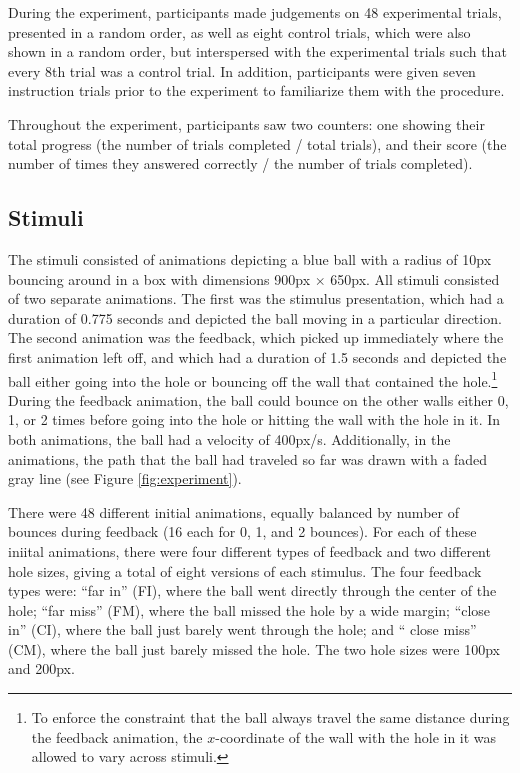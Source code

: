 \documentclass[10pt,letterpaper]{article}
\begin{document}
During the experiment, participants made judgements on 48 experimental trials, presented in a random order, as well as eight control trials, which were also shown in a random order, but interspersed with the experimental trials such that every 8th trial was a control trial. In addition, participants were given seven instruction trials prior to the experiment to familiarize them with the procedure.

Throughout the experiment, participants saw two counters: one showing their total progress (the number of trials completed / total trials), and their score (the number of times they answered correctly / the number of trials completed).

\subsection{Stimuli}

The stimuli consisted of animations depicting a blue ball with a radius of 10px bouncing around in a box with dimensions 900px $\times$ 650px. All stimuli consisted of two separate animations. The first was the stimulus presentation, which had a duration of 0.775 seconds and depicted the ball moving in a particular direction. The second animation was the feedback, which picked up immediately where the first animation left off, and which had a duration of 1.5 seconds and depicted the ball either going into the hole or bouncing off the wall that contained the hole.\footnote{To enforce the constraint that the ball always travel the same distance during the feedback animation, the $x$-coordinate of the wall with the hole in it was allowed to vary across stimuli.} During the feedback animation, the ball could bounce on the other walls either 0, 1, or 2 times before going into the hole or hitting the wall with the hole in it. In both animations, the ball had a velocity of 400px/s. Additionally, in the animations, the path that the ball had traveled so far was drawn with a faded gray line (see Figure \ref{fig:experiment}).

There were 48 different initial animations, equally balanced by number of bounces during feedback (16 each for 0, 1, and 2 bounces). For each of these iniital animations, there were four different types of feedback and two different hole sizes, giving a total of eight versions of each stimulus. The four feedback types were: ``far in'' (FI), where the ball went directly through the center of the hole; ``far miss'' (FM), where the ball missed the hole by a wide margin; ``close in'' (CI), where the ball just barely went through the hole; and `` close miss'' (CM), where the ball just barely missed the hole. The two hole sizes were 100px and 200px.
\end{document}
